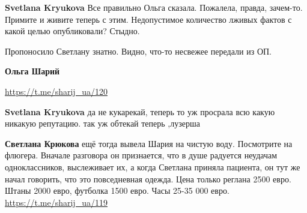 \begin{itemize}
\begin{itemize}
\textbf{Svetlana Kryukova} Все правильно Ольга сказала. Пожалела, правда, зачем-то. Примите и живите теперь с этим. Недопустимое количество лживых фактов с какой целью опубликовали? Стыдно.

 
Пропоносило Светлану знатно. Видно, что-то несвежее передали из ОП.

 
\textbf{Ольга Шарий}

 
\url{https://t.me/sharij_ua/120}

 
\textbf{Svetlana Kryukova} да не кукарекай, теперь то уж просрала всю какую никакую репутацию. так уж обтекай теперь ,лузерша


 
\textbf{Светлана Крюкова} ещё тогда вывела Шария на чистую воду. Посмотрите на флюгера. Вначале разговора он признается, что в душе радуется неудачам одноклассников, выслеживает их, а когда Светлана приняла пациента, он тут же начал говорить, что это повседневная одежда. Цена только реглана 2500 евро. Штаны 2000 евро, футболка 1500 евро. Часы 25-35 000 евро. \url{https://t.me/sharij_ua/119}

 

\end{itemize}
\end{itemize}
